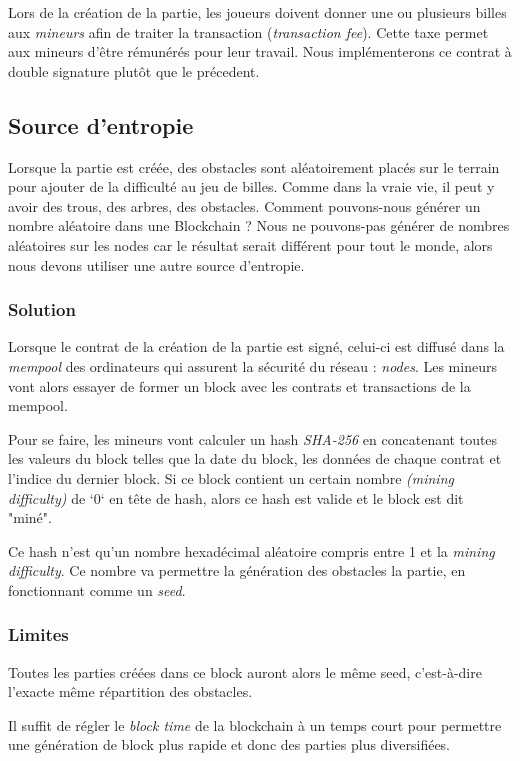 \documentclass{article}
\begin{document}
Lors de la création de la partie, les joueurs doivent donner une ou plusieurs billes aux \textit{mineurs} afin de traiter la transaction (\textit{transaction fee}). Cette taxe permet aux mineurs d'être rémunérés pour leur travail. Nous implémenterons ce contrat à double signature plutôt que le précedent.


\subsection{Source d'entropie}
Lorsque la partie est créée, des obstacles sont aléatoirement placés sur le terrain pour ajouter de la difficulté au jeu de billes. Comme dans la vraie vie, il peut y avoir des trous, des arbres, des obstacles. Comment pouvons-nous générer un nombre aléatoire dans une Blockchain ?
Nous ne pouvons-pas générer de nombres aléatoires sur les nodes car le résultat serait différent pour tout le monde, alors nous devons utiliser une autre source d'entropie.

\subsubsection{Solution}

Lorsque le contrat de la création de la partie est signé, celui-ci est diffusé dans la \textit{mempool} des ordinateurs qui assurent la sécurité du réseau : \textit{nodes}. Les mineurs vont alors essayer de former un block avec les contrats et transactions de la mempool.

Pour se faire, les mineurs vont calculer un hash \textit{SHA-256} en concatenant toutes les valeurs du block telles que la date du block, les données de chaque contrat et l'indice du dernier block. Si ce block contient un certain nombre \textit{(mining difficulty)} de `0` en tête de hash, alors ce hash est valide et le block est dit "miné".

Ce hash n'est qu'un nombre hexadécimal aléatoire compris entre 1 et la \textit{mining difficulty}. Ce nombre va permettre la génération des obstacles la partie, en fonctionnant comme un \textit{seed}.

\subsubsection{Limites}
Toutes les parties créées dans ce block auront alors le même seed, c'est-à-dire l'exacte même répartition des obstacles.  

Il suffit de régler le \textit{block time} de la blockchain à un temps court pour permettre une génération de block plus rapide et donc des parties plus diversifiées. 
\end{document}
